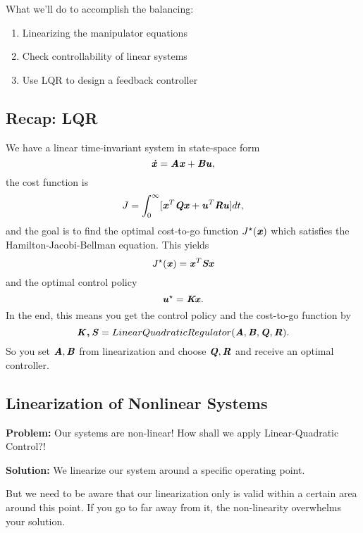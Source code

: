 What we'll do to accomplish the balancing: 
\begin{enumerate}
\item Linearizing the manipulator equations
\item Check controllability of linear systems
\item Use LQR to design a feedback controller
\end{enumerate}
\subsection{Recap: LQR}
We have a linear time-invariant system in state-space form
\begin{equation*} 
\bm{\mathit{\dot{x}}}=\bm{\mathit{Ax}}+\bm{\mathit{Bu}},
\end{equation*}
the cost function is 
\begin{equation*} 
J = \int_0^{\infty}[\bm{\mathit{x}}^T\bm{\mathit{Qx}}+\bm{\mathit{u}}	^T\bm{\mathit{Ru}}]dt,
\end{equation*}
and the goal is to find the optimal cost-to-go function $J^\star(\bm{\mathit{x}})$ which satisfies the Hamilton-Jacobi-Bellman equation.
This yields 
\begin{equation*} 
J^\star(\bm{\mathit{x}}) = \bm{\mathit{x}}^T\bm{\mathit{Sx}}
\end{equation*}
and the optimal control policy 
\begin{equation*} 
\bm{\mathit{u}}^\star=\bm{\mathit{Kx}}.
\end{equation*}
In the end, this means you get the control policy and the cost-to-go function by
\begin{equation*} 
\bm{\mathit{K,S}}=LinearQuadraticRegulator(\bm{\mathit{A}}, \bm{\mathit{B}}, \bm{\mathit{Q}}, \bm{\mathit{R}}).
\end{equation*}
So you set $\bm{\mathit{A}}, \bm{\mathit{B}}$ from linearization and choose $\bm{\mathit{Q}}, \bm{\mathit{R}}$ and receive an optimal controller.

\subsection{Linearization of Nonlinear Systems}
\textbf{Problem:} Our systems are non-linear! How shall we apply Linear-Quadratic Control?!

\textbf{Solution:} We linearize our system around a specific operating point.

But we need to be aware that our linearization only is valid within a certain area around this point. If you go to far away from it, the non-linearity overwhelms your solution. 


